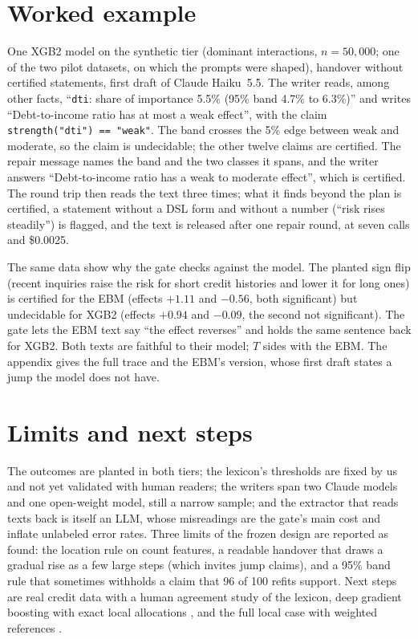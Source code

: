 \documentclass[11pt]{article}
\newcommand{\dsl}[1]{\texttt{#1}}
\begin{document}
\section{Worked example}

One XGB2 model on the synthetic tier (dominant interactions, $n = 50{,}000$; one of the two pilot datasets, on which
the prompts were shaped), handover without certified statements, first draft of Claude Haiku~5.5. The writer reads, among other facts, ``\dsl{dti}: share of importance 5.5\% (95\%
band 4.7\% to 6.3\%)'' and writes ``Debt-to-income ratio has at most a weak effect'', with the claim
\dsl{strength("dti") == "weak"}. The band crosses the 5\% edge between weak and moderate, so the claim is
undecidable; the other twelve claims are certified. The repair message names the band and the two classes it spans,
and the writer answers ``Debt-to-income ratio has a weak to moderate effect'', which is certified. The round trip then
reads the text three times; what it finds beyond the plan is certified, a statement without a DSL form and without a
number (``risk rises steadily'') is flagged, and the text is released after one repair round, at seven calls and
\$0.0025.

The same data show why the gate checks against the model. The planted sign flip (recent inquiries raise the risk for
short credit histories and lower it for long ones) is certified for the EBM (effects $+1.11$ and $-0.56$, both
significant) but undecidable for XGB2 (effects $+0.94$ and $-0.09$, the second not significant). The gate lets the EBM
text say ``the effect reverses'' and holds the same sentence back for XGB2. Both texts are faithful to their model;
$T$ sides with the EBM. The appendix gives the full trace and the EBM's version, whose first draft states a jump the
model does not have.

\section{Limits and next steps}

The outcomes are planted in both tiers; the lexicon's thresholds are fixed by us and not yet validated with human
readers; the writers span two Claude models and one open-weight model, still a narrow sample; and the extractor that
reads texts back is itself an LLM, whose misreadings are the gate's main cost and inflate unlabeled error rates. Three limits of the frozen
design are reported as found: the location rule on count features, a readable handover that draws a gradual rise as
a few large steps (which invites jump claims), and a 95\% band rule that sometimes withholds a claim that 96 of 100
refits support. Next steps are real credit data with a human agreement study of the lexicon, deep gradient boosting
with exact local allocations \citep{nair2022adverse}, and the full local case with weighted references
\citep{sudjianto2026evidence}.
\end{document}

